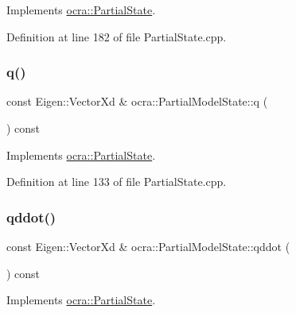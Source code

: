 Implements \hyperlink{classocra_1_1PartialState_a83979e39dd3631861c724514e49cb8b4}{ocra\+::\+Partial\+State}.



Definition at line 182 of file Partial\+State.\+cpp.

\hypertarget{classocra_1_1PartialModelState_ac50f637a2ce55608b4159b7dac2c543d}{}\label{classocra_1_1PartialModelState_ac50f637a2ce55608b4159b7dac2c543d} 
\subsubsection{\texorpdfstring{q()}{q()}}
{\footnotesize\ttfamily const Eigen\+::\+Vector\+Xd \& ocra\+::\+Partial\+Model\+State\+::q (\begin{DoxyParamCaption}{ }\end{DoxyParamCaption}) const\hspace{0.3cm}{\ttfamily [virtual]}}



Implements \hyperlink{classocra_1_1PartialState_a28f537d2c569eddb7f7d6dbbea073226}{ocra\+::\+Partial\+State}.



Definition at line 133 of file Partial\+State.\+cpp.

\hypertarget{classocra_1_1PartialModelState_a9be011bf4005c0b964f857a82b2b2b23}{}\label{classocra_1_1PartialModelState_a9be011bf4005c0b964f857a82b2b2b23} 
\subsubsection{\texorpdfstring{qddot()}{qddot()}}
{\footnotesize\ttfamily const Eigen\+::\+Vector\+Xd \& ocra\+::\+Partial\+Model\+State\+::qddot (\begin{DoxyParamCaption}{ }\end{DoxyParamCaption}) const\hspace{0.3cm}{\ttfamily [virtual]}}



Implements \hyperlink{classocra_1_1PartialState_ad12359c11926c2151dc1459e88b9fedc}{ocra\+::\+Partial\+State}.



